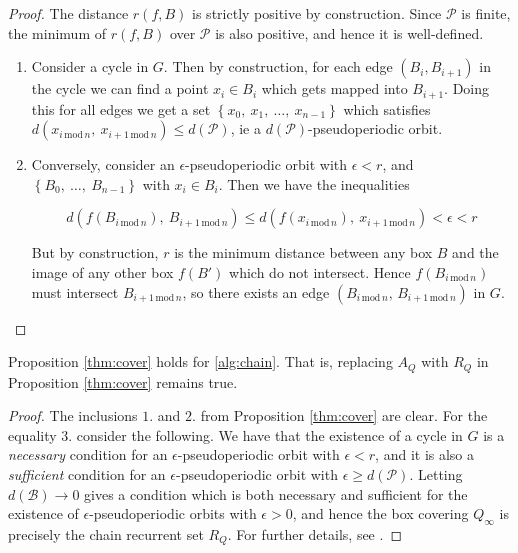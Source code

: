 \begin{proof}
    The distance $r(f, B)$ is strictly positive by construction. Since $\mathcal{P}$ is 
    finite, the minimum of $r(f, B)$ over $\mathcal{P}$ is also positive, and hence 
    it is well-defined. 

    \begin{enumerate}
        \item Consider a cycle in $G$. Then by construction, for each edge $(B_i, B_{i+1})$ 
        in the cycle we can find a point $x_i \in B_i$ which gets mapped into $B_{i+1}$. 
        Doing this for all edges we get a set $\left\{ x_0,\ x_1,\ \ldots,\ x_{n-1} \right\}$ 
        which satisfies $d(x_{i\, \text{mod}\, n},\ x_{i+1\, \text{mod}\, n}) \leq d(\mathcal{P})$, 
        ie a $d(\mathcal{P})$-pseudoperiodic orbit. 
        \item Conversely, consider an $\epsilon$-pseudoperiodic orbit with $\epsilon < r$, 
        and $\left\{ B_0,\ \ldots,\ B_{n-1} \right\}$ with $x_i \in B_i$. 
        Then we have the inequalities 

        \begin{equation}
            d(f(B_{i\, \text{mod}\, n}),\ B_{i+1\, \text{mod}\, n}) \leq
            d(f(x_{i\, \text{mod}\, n}),\ x_{i+1\, \text{mod}\, n}) <
            \epsilon < r
        \end{equation}

        But by construction, $r$ is the minimum distance between any box $B$ and the image 
        of any other box $f(B')$ which do not intersect. Hence 
        $f(B_{i\, \text{mod}\, n})$ must intersect $B_{i+1\, \text{mod}\, n}$, so there 
        exists an edge $(B_{i\, \text{mod}\, n},\, B_{i+1\, \text{mod}\, n})$ in $G$. 
    \end{enumerate}
\end{proof}

\begin{corollary}
    Proposition \ref{thm:cover} holds for \autoref{alg:chain}. That is, replacing $A_Q$ 
    with $R_Q$ in Proposition \ref{thm:cover} remains true. 
\end{corollary}

\begin{proof}
    The inclusions $1.$ and $2.$ from Proposition \ref{thm:cover} are clear. For the 
    equality $3.$ consider the following. 
    We have that the existence of a cycle in $G$ is a \emph{necessary} condition for an
    $\epsilon$-pseudoperiodic orbit with $\epsilon < r$, and it is also a 
    \emph{sufficient} condition for an $\epsilon$-pseudoperiodic orbit with 
    $\epsilon \geq d(\mathcal{P})$. Letting $d(\mathcal{B}) \to 0$ gives a condition which 
    is both necessary and sufficient for the existence of $\epsilon$-pseudoperiodic orbits 
    with $\epsilon > 0$, and hence the box covering $Q_\infty$ is precisely the chain 
    recurrent set $R_Q$. For further details, see \cite*{chain}. 
\end{proof}

